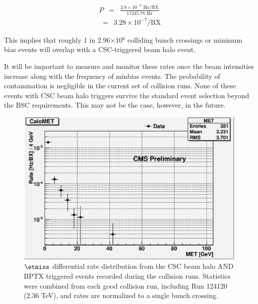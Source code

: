\begin{eqnarray}
P &=& \frac{3.8 \times 10^{-3}\mbox{ Hz}/\mbox{BX} }{11245.78 \mbox{ Hz}} 
\end{eqnarray}
\begin{eqnarray}
  &=& 3.28\times 10^{-7} /\mbox{BX}
\end{eqnarray}

This implies that roughly 1 in 2.96$\times$10$^{6}$ colliding bunch crossings or minimum bias events will overlap with a CSC-triggered beam halo event.  
 
It will be important to measure and monitor these rates once the beam intensities increase along with the frequency of minbias events. The probability of contamination is negligible in the current set of collision runs.  None of these events with CSC beam halo triggers survive the standard event selection beyond the BSC requirements. This may not be the case, however, in the future.  \\


\begin{figure}[htp]
\begin{center}
\includegraphics[scale=0.75]{plots_BeamHalo/CaloMET.eps}
\end{center}
\caption{$\etmiss$ differential rate distribution from the CSC beam halo AND BPTX triggered events recorded during the collision runs. Statistics were combined from each good collision run, including Run 124120 (2.36 TeV), and rates are normalized to a single bunch crossing.   }
\label{fig:BH_CaloMET}
\end{figure}

